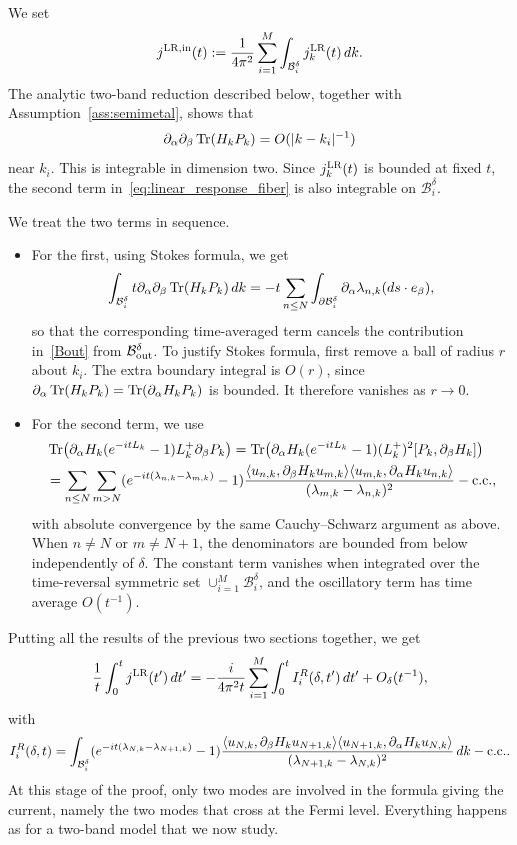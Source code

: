 \documentclass[a4paper,11pt]{article}
\theoremstyle{plain}
\theoremstyle{remark}
\begin{document}
We set
\begin{equation}\label{eq:jepsin}
j^{{\rm LR},{\rm in}}(t):=\frac1{4\pi^2}
\sum_{i=1}^M\int_{\mathcal B_i^\delta}j_k^{\rm LR}(t)\,dk.
\end{equation}
The analytic two-band reduction described below, together with
Assumption~\ref{ass:semimetal}, shows that
\[
\partial_\alpha\partial_\beta\Tr(H_kP_k)=O(|k-k_i|^{-1})
\]
near $k_i$. This is integrable in dimension two. Since $j_k^{\rm LR}(t)$
is bounded at fixed $t$, the second term
in~\eqref{eq:linear_response_fiber} is also integrable on
$\mathcal B_i^\delta$.

\medskip

We treat the two terms in sequence.
\begin{itemize}
\item For the first, using Stokes formula, we get
\begin{align*}
\int_{\mathcal B_i^\delta}t\partial_\alpha\partial_\beta
\Tr(H_kP_k)\,dk
=-t\sum_{n\le N}\int_{\partial\mathcal B_i^\delta}
\partial_\alpha\lambda_{n,k}(ds\cdot e_\beta),
\end{align*}
so that the corresponding time-averaged term cancels the contribution
in~\eqref{Bout} from $\mathcal B_{\rm out}^\delta$.
To justify Stokes formula, first remove a ball of radius $r$ about $k_i$.
The extra boundary integral is $O(r)$, since
$\partial_\alpha\Tr(H_kP_k)=\Tr(\partial_\alpha H_kP_k)$ is bounded.
It therefore vanishes as $r\to0$.
\item For the second term, we use
\begin{align*}
&\Tr(\partial_\alpha H_k(e^{-itL_k}-1)L_k^+\partial_\beta P_k)
=\Tr(\partial_\alpha H_k(e^{-itL_k}-1)(L_k^+)^2[P_k,\partial_\beta H_k])\\
&=\sum_{n\le N}\sum_{m>N}
(e^{-it(\lambda_{n,k}-\lambda_{m,k})}-1)
\frac{\langle u_{n,k},\partial_\beta H_ku_{m,k}\rangle
\langle u_{m,k},\partial_\alpha H_ku_{n,k}\rangle}
{(\lambda_{m,k}-\lambda_{n,k})^2}-{\rm c.c.},
\end{align*}
with absolute convergence by the same Cauchy--Schwarz argument as above.
When $n\ne N$ or $m\ne N+1$, the denominators are bounded from below
independently of $\delta$. The constant term vanishes when integrated
over the time-reversal symmetric set $\cup_{i=1}^M\mathcal B_i^\delta$,
and the oscillatory term has time average $O(t^{-1})$.
\end{itemize}

Putting all the results of the previous two sections together, we get
\[
\frac1t\int_0^t j^{\rm LR}(t')\,dt'
=-\frac{i}{4\pi^2t}\sum_{i=1}^M\int_0^t I_i^R(\delta,t')\,dt'
+O_\delta(t^{-1}),
\]
with
\[
I_i^R(\delta,t)=\int_{\mathcal B_i^\delta}
(e^{-it(\lambda_{N,k}-\lambda_{N+1,k})}-1)
\frac{\langle u_{N,k},\partial_\beta H_ku_{N+1,k}\rangle
\langle u_{N+1,k},\partial_\alpha H_ku_{N,k}\rangle}
{(\lambda_{N+1,k}-\lambda_{N,k})^2}\,dk-{\rm c.c.}.
\]
At this stage of the proof, only two modes are involved in the formula
giving the current, namely the two modes that cross at the Fermi level.
Everything happens as for a two-band model that we now study.
\end{document}
